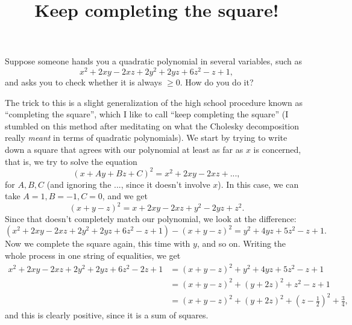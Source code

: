 \documentclass[letterpaper,11pt]{article}
\begin{document}
\newtheorem*{thm}{Theorem}

\theoremstyle{remark}
\newtheorem*{exer}{Exercise}

\title{Keep completing the square!}
\date{}
\maketitle

Suppose someone hands you a quadratic polynomial in several variables, such as
\[
x^2 + 2xy - 2xz + 2y^2 + 2yz + 6z^2 - z + 1,
\]
and asks you to check whether it is always $\ge 0$. How do you do it?

The trick to this is a slight generalization of the high school procedure known as ``completing the square'', which I like to call ``keep completing the square'' (I stumbled on this method after meditating on what the Cholesky decomposition really \emph{meant} in terms of quadratic polynomials). We start by trying to write down a square that agrees with our polynomial at least as far as $x$ is concerned, that is, we try to solve the equation
\[
(x + Ay + Bz + C)^2 = x^2 + 2xy - 2xz + ...,
\]
for $A,B,C$ (and ignoring the $...$, since it doesn't involve $x$). In this case, we can take $A = 1, B = -1, C = 0$, and we get
\[
(x + y - z)^2 = x + 2xy - 2xz + y^2 - 2yz + z^2.
\]
Since that doesn't completely match our polynomial, we look at the difference:
\[
(x^2 + 2xy - 2xz + 2y^2 + 2yz + 6z^2 - z + 1) - (x + y - z)^2 = y^2 + 4yz + 5z^2 - z + 1.
\]
Now we complete the square again, this time with $y$, and so on. Writing the whole process in one string of equalities, we get
\begin{align*}
x^2 + 2xy - 2xz + 2y^2 + 2yz + 6z^2 - 2z + 1 &= (x + y - z)^2 + y^2 + 4yz + 5z^2 - z + 1\\
&= (x + y - z)^2 + (y + 2z)^2 + z^2 - z + 1\\
&= (x + y - z)^2 + (y + 2z)^2 + (z - \tfrac{1}{2})^2 + \tfrac{3}{4},
\end{align*}
and this is clearly positive, since it is a sum of squares.
\end{document}
